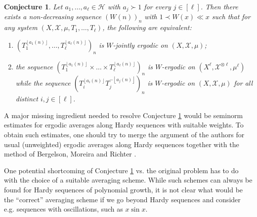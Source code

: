 \documentclass[11pt]{amsart}
\newtheorem{conjecture}[lemma]{Conjecture}
\theoremstyle{definition}
\newcommand{\Z}{{\mathbb Z}}
\newcommand{\CX}{{\mathcal X}}
\newcommand{\1}{{\mathbf{1}}}
\newcommand{\floor}[1]{{\left \lfloor #1 \right \rfloor}}
\begin{document}
\begin{conjecture}\label{C: weighted conjecture}
    Let $a_1,\ldots, a_\ell\in \mathcal{H}$ with $a_j\succ 1$ for every $j\in[\ell]$. Then there exists a non-decreasing sequence $(W(n))_n$ with $1\prec W(x)\ll x$
    such that for any system $(X,\CX, \mu,T_1,\ldots, T_\ell)$, the following are equivalent:\\
\begin{enumerate}
    \item $(T_1^{\floor{a_1(n)}},\ldots, T_\ell^{\floor{a_\ell(n)}})_n$ is $W$-jointly ergodic on $(X,\CX,\mu)$;\\
    \item the sequence $(T_1^{\floor{a_1(n)}}\times\dots\times T_\ell^{\floor{a_\ell(n)}})_n$ is $W$-ergodic on $(X^\ell, \CX^{\otimes \ell},\mu^{\ell})$ while the sequence $(T_i^{\floor{a_i(n)}}T_j^{-\floor{a_j(n)}})_n$ is $W$-ergodic on $(X,\CX, \mu)$ for all distinct $i, j\in[\ell]$.
    \end{enumerate}
\end{conjecture}
    A major missing ingredient needed to resolve Conjecture \ref{C: weighted conjecture} would be seminorm estimates for ergodic averages along Hardy sequences with suitable weights. To obtain such estimates, one should try to merge the argument of the authors for usual (unweighted) ergodic averages along Hardy sequences together with the method of Bergelson, Moreira and Richter \cite{BMR20}.

{One potential shortcoming of Conjecture \ref{C: weighted conjecture} vs. the original problem has to do with the choice of a suitable averaging scheme. While such schemes can always be found for Hardy sequences of polynomial growth, it is not clear what would be the ``correct'' averaging scheme if we go beyond Hardy sequences and consider e.g. sequences with oscillations, such as $x\sin{x}$.}
\end{document}
